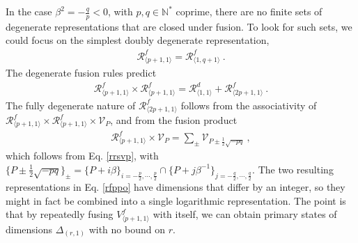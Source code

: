\documentclass[12pt, a4paper]{article}
\theoremstyle{break}
\begin{document}
In the case $\beta^2=-\frac{q}{p}<0$, with $p,q\in\mathbb{N}^*$ coprime, there are no finite sets of degenerate representations that are closed under fusion. To look for such sets, we could focus on the simplest doubly degenerate representation, 
\begin{align}
 \mathcal{R}^f_{\langle p+1,1\rangle}=\mathcal{R}^f_{\langle 1,q+1\rangle}\ .
\end{align}
The degenerate fusion rules predict  
\begin{align}
 \mathcal{R}^f_{\langle p+1,1\rangle}\times \mathcal{R}^f_{\langle p+1,1\rangle} = \mathcal{R}^d_{\langle 1,1\rangle} + \mathcal{R}^f_{\langle 2p+1,1\rangle}\ .
 \label{rfppo}
\end{align}
The fully degenerate nature of $\mathcal{R}^f_{\langle 2p+1,1\rangle}$ follows from the associativity of $\mathcal{R}^f_{\langle p+1,1\rangle}\times \mathcal{R}^f_{\langle p+1,1\rangle}\times \mathcal{V}_P$, and from the fusion product
\begin{align}
 \mathcal{R}^f_{\langle p+1,1\rangle} \times \mathcal{V}_P = \sum_{\pm} \mathcal{V}_{P\pm \frac12\sqrt{-pq}}\ ,
\end{align}
which follows from Eq. \eqref{rrsvp}, with $\{P\pm \frac12\sqrt{-pq}\}_\pm = \{P+i\beta\}_{i=-\frac{p}{2},\cdots, \frac{p}{2}} \cap \{P+j\beta^{-1}\}_{j=-\frac{q}{2},\cdots, \frac{q}{2}}$. 
The two resulting representations in Eq. \eqref{rfppo} have dimensions that differ by an integer, so they might in fact be combined into a single logarithmic representation. The point is that by repeatedly fusing $V^f_{\langle p+1,1\rangle}$ with itself, we can obtain primary states of dimensions $\Delta_{(r,1)}$ with no bound on $r$. 
\end{document}
